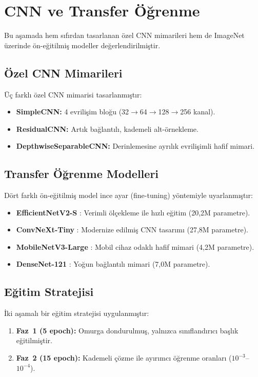\documentclass[conference]{IEEEtran}
\begin{document}
\section{CNN ve Transfer \"{O}\u{g}renme}
Bu a\c{s}amada hem s{\i}f{\i}rdan tasarlanan \"{o}zel CNN mimarileri hem de ImageNet \"{u}zerinde \"{o}n-e\u{g}itilmi\c{s} modeller de\u{g}erlendirilmi\c{s}tir.

\subsection{\"{O}zel CNN Mimarileri}
\"{U}\c{c} farkl{\i} \"{o}zel CNN mimarisi tasarlanm{\i}\c{s}t{\i}r:
\begin{itemize}
    \item \textbf{SimpleCNN:} 4 evrili\c{s}im blo\u{g}u (32$\rightarrow$64$\rightarrow$128$\rightarrow$256 kanal).
    \item \textbf{ResidualCNN:} Art{\i}k ba\u{g}lant{\i}l{\i}, kademeli alt-\"{o}rnekleme.
    \item \textbf{DepthwiseSeparableCNN:} Derinlemesine ayr{\i}l{\i}k evrili\c{s}imli hafif mimari.
\end{itemize}

\subsection{Transfer \"{O}\u{g}renme Modelleri}
D\"{o}rt farkl{\i} \"{o}n-e\u{g}itilmi\c{s} model ince ayar (fine-tuning) y\"{o}ntemiyle uyarlanm{\i}\c{s}t{\i}r:
\begin{itemize}
    \item \textbf{EfficientNetV2-S} \cite{tan2021efficientnetv2}: Verimli \"{o}l\c{c}ekleme ile h{\i}zl{\i} e\u{g}itim (20,2M parametre).
    \item \textbf{ConvNeXt-Tiny} \cite{liu2022convnet}: Modernize edilmi\c{s} CNN tasar{\i}m{\i} (27,8M parametre).
    \item \textbf{MobileNetV3-Large} \cite{howard2019searching}: Mobil cihaz odakl{\i} hafif mimari (4,2M parametre).
    \item \textbf{DenseNet-121} \cite{huang2017densely}: Yo\u{g}un ba\u{g}lant{\i}l{\i} mimari (7,0M parametre).
\end{itemize}

\subsection{E\u{g}itim Stratejisi}
\.{I}ki a\c{s}amal{\i} bir e\u{g}itim stratejisi uygulanm{\i}\c{s}t{\i}r:
\begin{enumerate}
    \item \textbf{Faz~1 (5 epoch):} Omurga dondurulmu\c{s}, yaln{\i}zca s{\i}n{\i}fland{\i}r{\i}c{\i} ba\c{s}l{\i}k e\u{g}itilmi\c{s}tir.
    \item \textbf{Faz~2 (15 epoch):} Kademeli \c{c}\"{o}zme ile ay{\i}r{\i}mc{\i} \"{o}\u{g}renme oranlar{\i} ($10^{-3}$--$10^{-4}$).
\end{enumerate}
\end{document}
